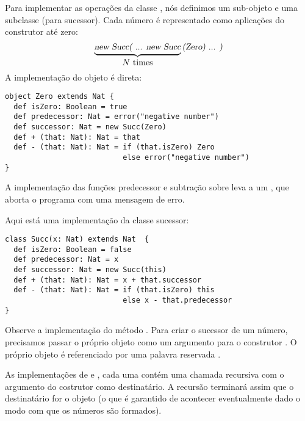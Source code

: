 Para implementar as opera\c{c}\~{o}es da classe , n\'{o}s definimos um
sub-objeto  e uma subclasse  (para sucessor). Cada 
n\'{u}mero  \'{e} representado como  aplica\c{c}\~{o}es do construtor 
at\'{e} zero: 
 \[
 \underbrace{\mbox{\sl new Succ( ... new Succ}}_{\mbox{$N$ times}}\mbox{\sl (Zero) ... )}
 \]
A implementa\c{c}\~{a}o do objeto  \'{e} direta:
\begin{lstlisting}
object Zero extends Nat {
  def isZero: Boolean = true
  def predecessor: Nat = error("negative number")
  def successor: Nat = new Succ(Zero)
  def + (that: Nat): Nat = that
  def - (that: Nat): Nat = if (that.isZero) Zero
                           else error("negative number")
}
\end{lstlisting}

A implementa\c{c}\~{a}o das fun\c{c}\~{o}es  predecessor e subtra\c{c}\~{a}o sobre  leva a 
um , que aborta o programa com uma mensagem de erro.

Aqui est\'{a} uma implementa\c{c}\~{a}o da classe sucessor: 

\begin{lstlisting}
class Succ(x: Nat) extends Nat  {
  def isZero: Boolean = false
  def predecessor: Nat = x
  def successor: Nat = new Succ(this)
  def + (that: Nat): Nat = x + that.successor
  def - (that: Nat): Nat = if (that.isZero) this 
                           else x - that.predecessor
}
\end{lstlisting}

Observe a implementa\c{c}\~{a}o do m\'{e}todo . Para criar o 
sucessor de um n\'{u}mero, precisamos passar o pr\'{o}prio objeto como um 
argumento para o construtor . O pr\'{o}prio objeto \'{e} referenciado
por uma palavra reservada .   

As implementa\c{c}\~{o}es de \code{+} e \code{-}, cada uma cont\'{e}m uma chamada 
recursiva com o argumento do costrutor como destinat\'{a}rio. A recurs\~{a}o 
terminar\'{a} assim que o destinat\'{a}rio for o objeto  (o que \'{e} 
garantido de acontecer eventualmente dado o modo com que os n\'{u}meros s\~{a}o formados).


